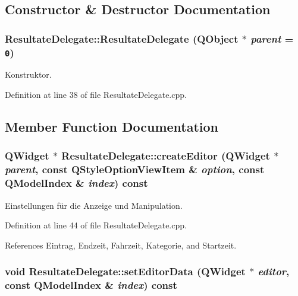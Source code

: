 \subsection{Constructor \& Destructor Documentation}
\hypertarget{class_resultate_delegate_3798be83d90e144dad0a2b031873a6b9}{
\subsubsection[ResultateDelegate]{\setlength{\rightskip}{0pt plus 5cm}ResultateDelegate::ResultateDelegate (QObject $\ast$ {\em parent} = {\tt 0})}}
\label{class_resultate_delegate_3798be83d90e144dad0a2b031873a6b9}


Konstruktor. 



Definition at line 38 of file ResultateDelegate.cpp.

\subsection{Member Function Documentation}
\hypertarget{class_resultate_delegate_edeae75738a99f9b2fb524daddec21fe}{
\subsubsection[createEditor]{\setlength{\rightskip}{0pt plus 5cm}QWidget $\ast$ ResultateDelegate::createEditor (QWidget $\ast$ {\em parent}, \/  const QStyleOptionViewItem \& {\em option}, \/  const QModelIndex \& {\em index}) const}}
\label{class_resultate_delegate_edeae75738a99f9b2fb524daddec21fe}


Einstellungen für die Anzeige und Manipulation. 



Definition at line 44 of file ResultateDelegate.cpp.

References Eintrag, Endzeit, Fahrzeit, Kategorie, and Startzeit.\hypertarget{class_resultate_delegate_9091c5a7c22a6041062625fba1ab5c70}{
\subsubsection[setEditorData]{\setlength{\rightskip}{0pt plus 5cm}void ResultateDelegate::setEditorData (QWidget $\ast$ {\em editor}, \/  const QModelIndex \& {\em index}) const}}
\label{class_resultate_delegate_9091c5a7c22a6041062625fba1ab5c70}


